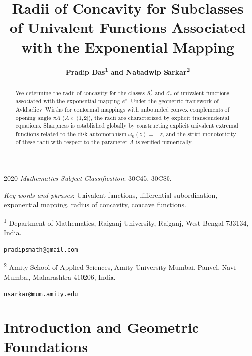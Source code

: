 \documentclass[12pt]{article}
\title{
\textbf{
Radii of Concavity for Subclasses of Univalent Functions Associated with the Exponential Mapping}
}
\author{
\textbf{
Pradip Das\textsuperscript{1}
and
Nabadwip Sarkar\textsuperscript{2}
}
}
\date{}
\begin{document}
\maketitle

\makeatletter
\def\blfootnote{
\gdef\@thefnmark{}
\@footnotetext
}
\makeatother

\blfootnote{
2020 \emph{Mathematics Subject Classification}:
30C45, 30C80.
}

\blfootnote{
\emph{Key words and phrases}:
Univalent functions,
differential subordination,
exponential mapping,
radius of concavity,
concave functions.
}

\begin{center}
\small

\textsuperscript{1}
Department of Mathematics,
Raiganj University,
Raiganj,
West Bengal-733134,
India.

\texttt{pradipsmath@gmail.com}

\vspace{0.3cm}

\textsuperscript{2}
Amity School of Applied Sciences,
Amity University Mumbai,
Panvel,
Navi Mumbai,
Maharashtra-410206,
India.

\texttt{nsarkar@mum.amity.edu}

\end{center}

\vspace{0.6cm}

\begin{abstract}

We determine the radii of concavity for the classes $\mathcal{S}_e^*$ and $\mathcal{C}_e$ of univalent functions associated with the exponential mapping $e^z$. Under the geometric framework of Avkhadiev--Wirths for conformal mappings with unbounded convex complements of opening angle $\pi A$ ($A \in (1,2]$), the radii are characterized by explicit transcendental equations. Sharpness is established globally by constructing explicit univalent extremal functions related to the disk automorphism $\omega_0(z) = -z$, and the strict monotonicity of these radii with respect to the parameter $A$ is verified numerically.

\end{abstract}

\section{Introduction and Geometric Foundations}
\end{document}
